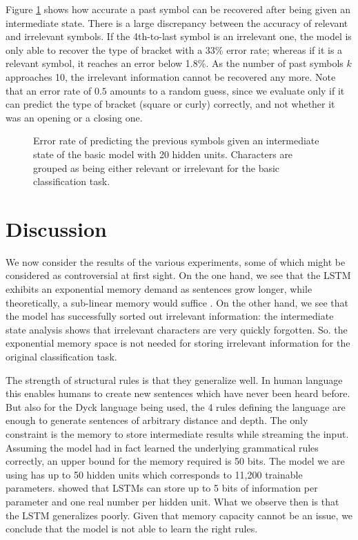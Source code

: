 \documentclass[11pt,a4paper]{article}
\newlength\figureheight
\newlength\figurewidth
\begin{document}
Figure \ref{fig:analysis_previous_results} shows how accurate a past symbol can be recovered after being given an intermediate state. There is a large discrepancy between the accuracy of relevant and irrelevant symbols. If the 4th-to-last symbol is an irrelevant one, the model is only able to recover the type of bracket with a 33\% error rate; whereas if it is a relevant symbol, it reaches an error below 1.8\%. As the number of past symbols $k$ approaches 10, the irrelevant information cannot be recovered any more. Note that an error rate of $0.5$ amounts to a random guess, since we evaluate only if it can predict the type of bracket (square or curly) correctly, and not whether it was an opening or a closing one.

\setlength\figureheight{4cm}
\setlength\figurewidth{\linewidth}
\begin{figure}[ht]
    \caption{Error rate of predicting the previous symbols given an intermediate state of the basic model with 20 hidden units. Characters are grouped as being either relevant or irrelevant for the basic classification task.}%
    \label{fig:analysis_previous_results}%
\end{figure}

\section{Discussion}

We now consider the results of the various experiments, some of which might be considered as controversial at first sight. On the one hand, we see that the LSTM exhibits an exponential memory demand as sentences grow longer, while theoretically, a sub-linear memory would suffice \cite{magniez2014recognizing}. On the other hand, we see that the model has successfully sorted out irrelevant information: the intermediate state analysis shows that irrelevant characters are very quickly forgotten. So. the exponential memory space is not needed for storing irrelevant information for the original classification task.

The strength of structural rules is that they generalize well. In human language this enables humans to create new sentences which have never been heard before. But also for the Dyck language being used, the 4 rules defining the language are enough to generate sentences of arbitrary distance and depth. The only constraint is the memory to store intermediate results while streaming the input. Assuming the model had in fact learned the underlying grammatical rules correctly, an upper bound for the memory required is 50 bits. The model we are using has up to 50 hidden units which corresponds to 11,200 trainable parameters. %
\citeauthor{collins2016capacity}  showed that LSTMs can store up to 5 bits of information per parameter and one real number per hidden unit. 
What we observe then is that the LSTM generalizes poorly. Given that memory capacity cannot be an issue, we conclude that the model is not able to learn the right rules.
\end{document}
